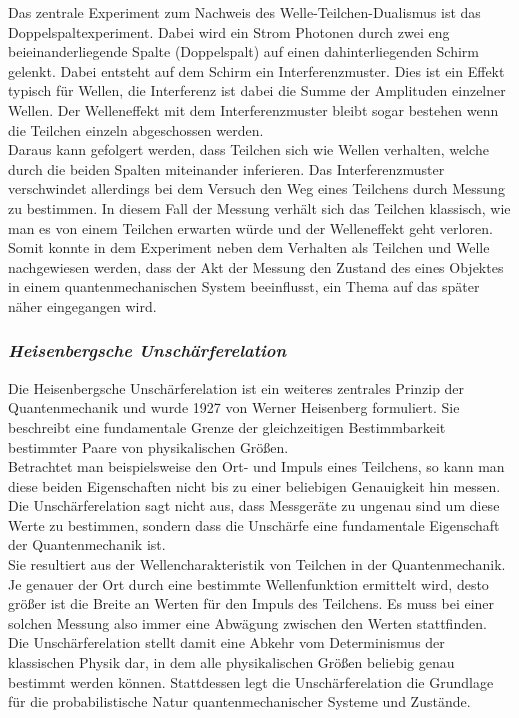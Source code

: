 Das zentrale Experiment zum Nachweis des Welle-Teilchen-Dualismus ist das Doppelspaltexperiment. Dabei wird ein Strom Photonen durch zwei eng beieinanderliegende Spalte (Doppelspalt) auf einen dahinterliegenden Schirm gelenkt. Dabei entsteht auf dem Schirm ein Interferenzmuster. Dies ist ein Effekt typisch für  Wellen, die Interferenz ist dabei die Summe der Amplituden einzelner Wellen. Der Welleneffekt mit dem Interferenzmuster bleibt sogar bestehen wenn die Teilchen einzeln abgeschossen werden.\\
Daraus kann gefolgert werden, dass Teilchen sich wie Wellen verhalten, welche durch die beiden Spalten miteinander inferieren. Das Interferenzmuster verschwindet allerdings bei dem Versuch den Weg eines Teilchens durch Messung zu bestimmen. In diesem Fall der Messung verhält sich das Teilchen klassisch, wie man es von einem Teilchen erwarten würde und der Welleneffekt geht verloren.\\
Somit konnte in dem Experiment neben dem Verhalten als Teilchen und Welle nachgewiesen werden, dass der Akt der Messung den Zustand des eines Objektes in einem quantenmechanischen System beeinflusst, ein Thema auf das später näher eingegangen wird.

\subsubsection*{\textit{Heisenbergsche Unschärferelation}}

Die Heisenbergsche Unschärferelation ist ein weiteres zentrales Prinzip der Quantenmechanik und wurde 1927 von Werner Heisenberg formuliert. Sie beschreibt eine fundamentale Grenze der gleichzeitigen Bestimmbarkeit bestimmter Paare von physikalischen Größen.\\
Betrachtet man beispielsweise den Ort- und Impuls eines Teilchens, so kann man diese beiden Eigenschaften nicht bis zu einer beliebigen Genauigkeit hin messen. Die Unschärferelation sagt nicht aus, dass Messgeräte zu ungenau sind um diese Werte zu bestimmen, sondern dass die Unschärfe eine fundamentale Eigenschaft der Quantenmechanik ist.\\
Sie resultiert aus der Wellencharakteristik von Teilchen in der Quantenmechanik. Je genauer der Ort durch eine bestimmte Wellenfunktion ermittelt wird, desto größer ist die Breite an Werten für den Impuls des Teilchens. Es muss bei einer solchen Messung also immer eine Abwägung zwischen den Werten stattfinden. \\
Die Unschärferelation stellt damit eine Abkehr vom Determinismus der klassischen Physik dar, in dem alle physikalischen Größen beliebig genau bestimmt werden können. Stattdessen legt die Unschärferelation die Grundlage für die probabilistische Natur quantenmechanischer Systeme und Zustände.

